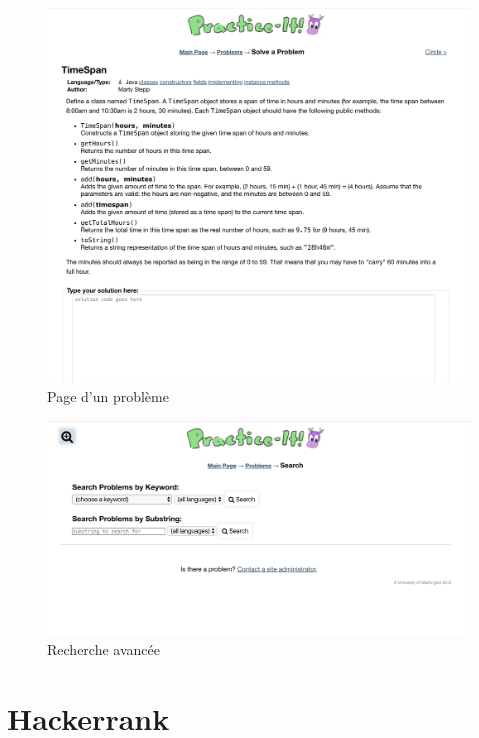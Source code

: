 \begin{figure}[H]
    \includegraphics[width=\textwidth,height=0.6\textheight,keepaspectratio]{images/comparison/practice-it-2.png}
    \centering
    \caption[Practice-it : page d'un problème]{Page d'un problème}
\end{figure}

\begin{figure}[H]
    \includegraphics[width=\textwidth,height=0.35\textheight,keepaspectratio]{images/comparison/practice-it-3.png}
    \centering
    \caption[Practice-it : recherche avancée]{Recherche avancée}
\end{figure}

\section{Hackerrank}

